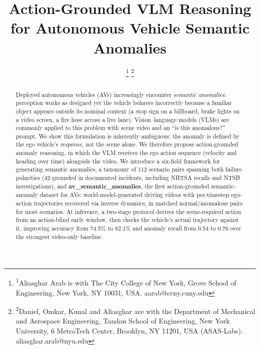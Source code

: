 \documentclass[conference]{IEEEtran}
\begin{document}
\title{Action-Grounded VLM Reasoning for Autonomous Vehicle Semantic Anomalies\\
}

\author{%
\thanks{\textsuperscript{1}Aliasghar Arab is with The City College of New York, Grove School of Engineering, New York, NY 10031, USA. aarab@ccny.cuny.edu}%
\thanks{\textsuperscript{2}Daniel, Omkar, Kunal and Aliasghar are with the Department of Mechanical and Aerospace Engineering, Tandon School of Engineering, New York University, 6 MetroTech Center, Brooklyn, NY 11201, USA (ASAS-Labs). aliasghar.arab@nyu.edu}%
}

\maketitle

\begin{abstract}
Deployed autonomous vehicles (AVs) increasingly encounter \emph{semantic anomalies}: perception works as designed yet the vehicle behaves incorrectly because a familiar object appears outside its nominal context (a stop sign on a billboard, brake lights on a video screen, a fire hose across a live lane). Vision--language models (VLMs) are commonly applied to this problem with scene video and an ``is this anomalous?'' prompt. We show this formulation is inherently ambiguous: the anomaly is defined by the ego vehicle's \emph{response}, not the scene alone. We therefore propose action-grounded anomaly reasoning, in which the VLM receives the ego action sequence (velocity and heading over time) alongside the video. We introduce a six-field framework for generating semantic anomalies, a taxonomy of 112 scenario pairs spanning both failure polarities (42 grounded in documented incidents, including NHTSA recalls and NTSB investigations), and \textbf{av\_semantic\_anomalies}, the first action-grounded semantic-anomaly dataset for AVs: world-model-generated driving videos with per-timestep ego-action trajectories recovered via inverse dynamics, in matched normal/anomalous pairs for most scenarios. At inference, a two-stage protocol derives the scene-required action from an action-blind early window, then checks the vehicle's actual trajectory against it, improving accuracy from 74.5\% to 82.1\% and anomaly recall from 0.54 to 0.76 over the strongest video-only baseline.
\end{abstract}
\end{document}
